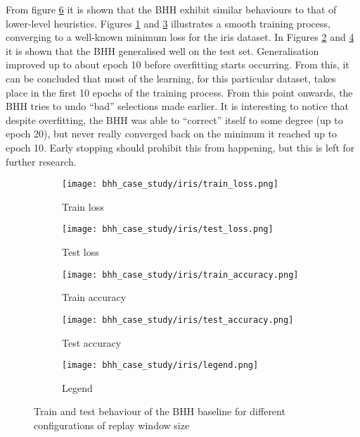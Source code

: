 From figure \ref{fig:results:case_study:iris:metric_plots} it is shown that the \Acs{BHH} exhibit similar behaviours to that of lower-level heuristics. Figures \ref{fig:results:case_study:iris:train:loss} and \ref{fig:results:case_study:iris:train:accuracy} illustrates a smooth training process, converging to a well-known minimum loss for the iris dataset. In Figures \ref{fig:results:case_study:iris:test:loss} and \ref{fig:results:case_study:iris:test:accuracy} it is shown that the \Acs{BHH} generalised well on the test set. Generalisation improved up to about epoch 10 before overfitting starts occurring. From this, it can be concluded that most of the learning, for this particular dataset, takes place in the first 10 epochs of the training process. From this point onwards, the \Acs{BHH} tries to undo ``bad'' selections made earlier. It is interesting to notice that despite overfitting, the \Acs{BHH} was able to ``correct'' itself to some degree (up to epoch 20), but never really converged back on the minimum it reached up to epoch 10. Early stopping should prohibit this from happening, but this is left for further research.

\begin{figure}[htbp]
	\begin{subfigure}{0.49\textwidth}
		\centering
		\texttt{[image: bhh\_case\_study/iris/train\_loss.png]}
		\caption{Train loss}
		\label{fig:results:case_study:iris:train:loss}
	\end{subfigure}
	\begin{subfigure}{0.49\textwidth}
		\centering
		\texttt{[image: bhh\_case\_study/iris/test\_loss.png]}
		\caption{Test loss}
		\label{fig:results:case_study:iris:test:loss}
	\end{subfigure}
	\par\bigskip
	\begin{subfigure}{0.49\textwidth}
		\centering
		\texttt{[image: bhh\_case\_study/iris/train\_accuracy.png]}
		\caption{Train accuracy}
		\label{fig:results:case_study:iris:train:accuracy}
	\end{subfigure}
	\begin{subfigure}{0.49\textwidth}
		\centering
		\texttt{[image: bhh\_case\_study/iris/test\_accuracy.png]}
		\caption{Test accuracy}
		\label{fig:results:case_study:iris:test:accuracy}
	\end{subfigure}
	\par\bigskip
	\begin{subfigure}{\textwidth}
		\centering
		\texttt{[image: bhh\_case\_study/iris/legend.png]}
		\caption{Legend}
		\label{fig:results:case_study:iris:legend}
	\end{subfigure}
	\par\bigskip
	\caption{Train and test behaviour of the \Ac{BHH} baseline for different configurations of replay window size}
	\label{fig:results:case_study:iris:metric_plots}
\end{figure}

